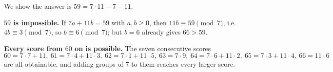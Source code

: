 We show the answer is $\boxed{59}=7\cdot11-7-11$.

\textbf{$59$ is impossible.} If $7a+11b=59$ with $a,b\ge0$, then $11b\equiv59\pmod7$, i.e. $4b\equiv3\pmod7$, so $b\equiv6\pmod7$; but $b=6$ already gives $66>59$.

\textbf{Every score from $60$ on is possible.} The seven consecutive scores
\[
60=7\cdot7+11,\ 61=7\cdot4+11\cdot3,\ 62=7\cdot1+11\cdot5,\ 63=7\cdot9,\ 64=7\cdot6+11\cdot2,\ 65=7\cdot3+11\cdot4,\ 66=11\cdot6
\]
are all obtainable, and adding groups of $7$ to them reaches every larger score.
